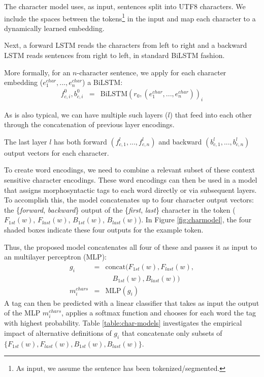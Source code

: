 \documentclass[11pt,a4paper]{article}
\newcommand{\forwardfirst}{\textit{F$_{1st}(w)$}}
\newcommand{\backwardfirst}{\textit{B$_{1st}(w)$}}
\newcommand{\forwardlast}{\textit{F$_{last}(w)$}}
\newcommand{\backwardlast}{\textit{B$_{last}(w)$}}
\begin{document}
The character model uses, as input, sentences split into UTF8 characters. We include the spaces between the tokens\footnote{As input, we assume the sentence has been tokenized/segmented.} in the input and map each character to a dynamically learned embedding.


Next, a forward LSTM reads the characters from left to right and a backward LSTM reads sentences from right to left, in standard BiLSTM fashion.

More formally, for an $n$-character sentence, we apply for each character embedding ($e_1^{char}, ..., e_n^{char}$) a BiLSTM:     
\begin{eqnarray*}
\nonumber
f_{c,i}^0, b_{c,i}^0 &=&\textrm{BiLSTM}(r_0,(e_1^{char}, ..., e_n^{char}))_i %
\end{eqnarray*}

As is also typical, we can have multiple such layers ($l$) that feed into each other through the concatenation of previous layer encodings.

The last layer $l$ has both forward $(f_{c,1}^l, ..., f_{c,n}^l)$ and backward $(b_{c,1}^l, ..., b_{c,n}^l)$ output vectors for each character. 

To create word encodings, we need to
combine a relevant subset of these context sensitive character encodings.
These word encodings can then be used in a model that assigns morphosyntactic tags to each word directly or via subsequent layers.
To accomplish this, the model concatenates up to four character output vectors: the \{\emph{forward}, \emph{backward}\} output of the \{\emph{first}, \emph{last}\} character in the token ($\forwardfirst$, $\forwardlast$, $\backwardfirst$, $\backwardlast$).  In Figure \ref{fig:charmodel}, the four
shaded boxes indicate these four outputs for the example token.

Thus, the proposed model concatenates all four of these and passes it as input to an multilayer perceptron (MLP):
\begin{eqnarray}
g_i & = & \textrm{concat}(\forwardfirst, \forwardlast, \nonumber  \\
& & \quad \backwardfirst, \backwardlast)  \label{eq:gi} \\
m_i^{chars} &=&\textrm{MLP}(g_i) \label{equation:mlp-char}\nonumber  
\end{eqnarray}
A tag can then be predicted with a linear classifier 
that takes as input the output of the MLP $m_i^{chars}$, applies a softmax function and chooses for each word the tag with highest probability. 
Table \ref{table:char-models} investigates
the empirical impact of alternative
definitions of $g_i$ that concatenate only subsets of $\{\forwardfirst, \forwardlast, \backwardfirst, \backwardlast\}$.
\end{document}
